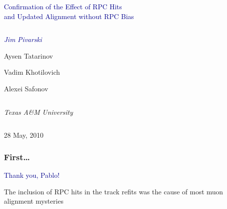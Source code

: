 \documentclass[compress]{beamer}
\begin{document}
\begin{frame}
\vfill
\begin{center}
\textcolor{darkblue}{\Large Confirmation of the Effect of RPC Hits \\ \vspace{0.2 cm} and Updated Alignment without RPC Bias}

\vfill
\begin{columns}
\begin{center}
\large
\textcolor{darkblue}{\it Jim Pivarski}

Aysen Tatarinov

Vadim Khotilovich

Alexei Safonov
\end{center}
\end{columns}

\begin{columns}
\begin{center}
\scriptsize
{\it Texas A\&M University}
\end{center}
\end{columns}

\vfill
28 May, 2010

\end{center}
\end{frame}


\small


\begin{frame}
\frametitle{First\ldots}

\begin{center}
\textcolor{darkblue}{\Huge Thank you, Pablo!}

\vfill
\Large The inclusion of RPC hits in the track refits was the cause of most muon alignment mysteries
\end{center}

\end{frame}
\end{document}
